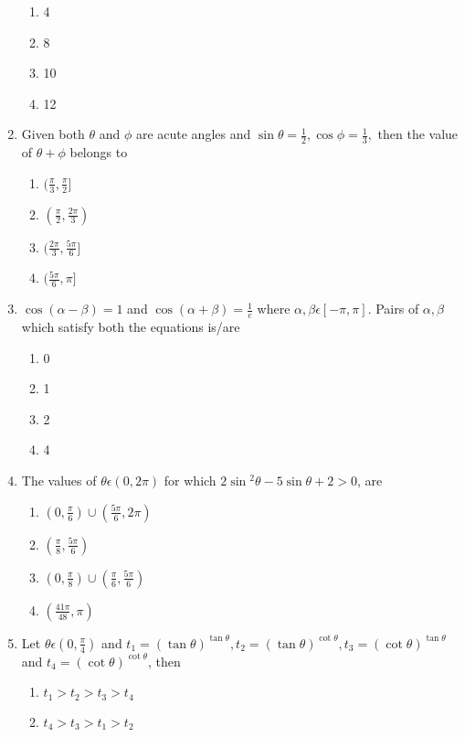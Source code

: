 \begin{enumerate}[label=\arabic*.,ref=\thesubsection.\theenumi]
\begin{enumerate}
       \item 4
       \item 8
       \item 10
       \item 12
   \end{enumerate}
   \item Given both $\theta$ and $\phi$ are acute angles and $\sin{\theta} =\frac{1}{2},\cos{\phi} =\frac{1}{3},$ then the value of $\theta + \phi$ belongs to 
   \begin{enumerate}
       \item $(\frac{\pi}{3},\frac{\pi}{2}]$
       \item $(\frac{\pi}{2},\frac{2\pi}{3})$
       \item $(\frac{2\pi}{3},\frac{5\pi}{6}]$
       \item $(\frac{5\pi}{6},\pi]$
   \end{enumerate}
   \item $\cos{(\alpha-\beta)} = 1$ and $\cos{(\alpha + \beta)} =\frac{1}{e}$ where $\alpha,\beta \epsilon [-\pi , \pi]$. Pairs of $\alpha,\beta$which satisfy both the equations is/are
   \begin{enumerate}
       \item 0
       \item 1
       \item 2
       \item 4
   \end{enumerate}
   \item The values of $\theta \epsilon (0 , 2\pi)$ for which $2\sin{^2\theta} - 5 \sin{\theta} + 2 > 0$, are
   \begin{enumerate}
       \item $(0 ,\frac{\pi}{6}) \cup (\frac{5\pi}{6},2\pi)$
       \item $(\frac{\pi}{8},\frac{5\pi}{6})$
       \item $(0 ,\frac{\pi}{8}) \cup (\frac{\pi}{6},\frac{5\pi}{6})$
       \item $(\frac{41\pi}{48},\pi)$
   \end{enumerate}
   \item Let $\theta \epsilon (0 ,\frac{\pi}{4})$ and $t_1 = (\tan{\theta})^{\tan{\theta}},t_2 = (\tan{\theta})^{\cot{\theta}},t_3 = (\cot{\theta})^{\tan{\theta}}$ and $t_4 = (\cot{\theta})^{\cot{\theta}}$, then
   \begin{enumerate}
       \item $t_1> t_2> t_3 > t_4$
       \item $t_4> t_3> t_1 > t_2$

\end{enumerate}
\end{enumerate}
